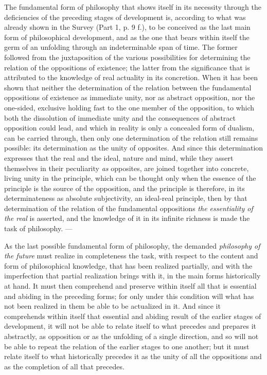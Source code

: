The fundamental form of philosophy that shows itself in its necessity
through the deficiencies of the preceding stages of development is,
according to what was already shown in the Survey (Part 1, p. 9 f.), to
be conceived as the last main form of philosophical development, and as
the one that bears within itself the germ of an unfolding through an
indeterminable span of time. The former followed from the juxtaposition
of the various possibilities for determining the relation of the
oppositions of existence; the latter from the significance that is
attributed to the knowledge of real actuality in its concretion. When
it has been shown that neither the determination of the relation
between the fundamental oppositions of existence as immediate unity,
nor as abstract opposition, nor the one-sided, exclusive
holding fast to the one member of the opposition, to which both the
dissolution of immediate unity and the consequences of abstract
opposition could lead, and which in reality is only a concealed form of
dualism, can be carried through, then only one determination of the
relation still remains possible: its determination as the unity of
opposites. And since this determination expresses that the real and the
ideal, nature and mind, while they assert themselves in their
peculiarity \emph{as} opposites, are joined together into concrete,
living unity in the principle, which can be thought only when the
essence of the principle is the source of the opposition, and the
principle is therefore, in its determinateness as absolute subjectivity,
an ideal-real principle, then by that determination of the relation of
the fundamental oppositions \emph{the essentiality of the real} is
asserted, and the knowledge of it in its infinite richness is made the
task of philosophy. ---

As the last possible fundamental form of philosophy, the demanded
\emph{philosophy of the future} must realize in completeness the task,
with respect to the content and form of philosophical knowledge, that
has been realized partially, and with the imperfection that partial
realization brings with it, in the main forms historically at hand. It
must then comprehend and preserve within itself all that is essential
and abiding in the preceding forms; for only under this condition will
what has not been realized in them be able to be actualized in it. And
since it comprehends within itself that essential and abiding result of
the earlier stages of development, it will not be able to relate itself
to what precedes and prepares it abstractly, as opposition or as the
unfolding of a single direction, and so will not be able to repeat the
relation of the earlier stages to one another; but it must relate
itself to what historically precedes it as the unity of all the
oppositions and as the completion of all that precedes.

